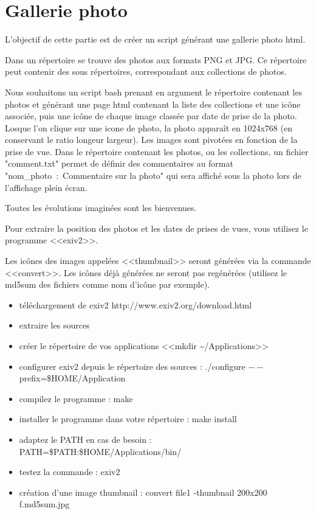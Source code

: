 \documentclass[11pt]{article}
\begin{document}
\section{Gallerie photo}

L'objectif de cette partie est de créer un script générant une gallerie photo html.

Dans un répertoire se trouve des photos aux formats PNG et JPG. Ce répertoire peut contenir des sous répertoires, correspondant aux collections de photos.

Nous souhaitons un script bash prenant en argument le répertoire contenant les photos et générant une page html contenant la liste des collections et une icône associée, puis une icône de chaque image classée par date de prise de la photo. Losque l'on clique sur une icone de photo, la photo apparaît en 1024x768 (en conservant le ratio longeur largeur). Les images sont pivotées en fonction de la prise de vue. Dans le répertoire contenant les photos, ou les collections, un fichier "comment.txt" permet de définir des commentaires au format "nom\_photo~:~Commentaire sur la photo" qui sera affiché sous la photo lors de l'affichage plein écran.

Toutes les évolutions imaginées sont les bienvenues.

Pour extraire la position des photos et les dates de prises de vues, vous utilisez le programme <<exiv2>>.

Les icônes des images appelées <<thumbnail>> seront générées via la commande <<convert>>. Les icônes déjà générées ne seront pas regénérées (utilisez le md5sum des fichiers comme nom d'icône par exemple).

\begin{solution}
	\begin{itemize}
		\item téléchargement de exiv2 http://www.exiv2.org/download.html
		\item extraire les sources
		\item créer le répertoire de vos applications <<mkdir \textasciitilde{}/Applications>>
		\item configurer exiv2 depuis le répertoire des sources : ./configure $--$prefix=\$HOME/Application
		\item compilez le programme : make
		\item installer le programme dans votre répertoire : make install
		\item adaptez le PATH en cas de besoin : PATH=\$PATH:\$HOME/Applications/bin/
		\item testez la commande : exiv2
		\item création d'une image thumbnail : convert file1 -thumbnail 200x200 f.md5sum.jpg
	\end{itemize}
\end{solution}
\end{document}
